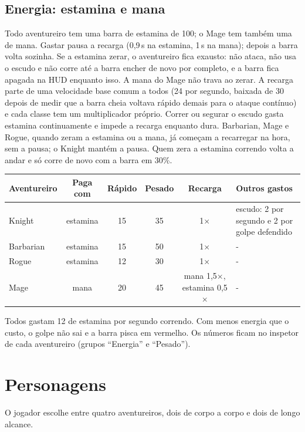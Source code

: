 \documentclass[11pt,a4paper]{article}
\begin{document}
\subsection{Energia: estamina e mana}
\label{sec:energia}

Todo aventureiro tem uma barra de estamina de 100; o Mage tem também uma de mana. Gastar pausa a recarga (0,9\,s na estamina, 1\,s na mana); depois a barra volta sozinha. Se a estamina zerar, o aventureiro fica exausto: não ataca, não usa o escudo e não corre até a barra encher de novo por completo, e a barra fica apagada na HUD enquanto isso. A mana do Mage não trava ao zerar. A recarga parte de uma velocidade base comum a todos (24 por segundo, baixada de 30 depois de medir que a barra cheia voltava rápido demais para o ataque contínuo) e cada classe tem um multiplicador próprio. Correr ou segurar o escudo gasta estamina continuamente e impede a recarga enquanto dura. Barbarian, Mage e Rogue, quando zeram a estamina ou a mana, já começam a recarregar na hora, sem a pausa; o Knight mantém a pausa. Quem zera a estamina correndo volta a andar e só corre de novo com a barra em 30\%.

\begin{xltabular}{\textwidth}{@{}lccccX@{}}
\toprule
\textbf{Aventureiro} & \textbf{Paga com} & \textbf{Rápido} & \textbf{Pesado} & \textbf{Recarga} & \textbf{Outros gastos} \\
\midrule
Knight    & estamina & 15 & 35 & 1$\times$ & escudo: 2 por segundo e 2 por golpe defendido \\
Barbarian & estamina & 15 & 50 & 1$\times$ & - \\
Rogue     & estamina & 12 & 30 & 1$\times$ & - \\
Mage      & mana     & 20 & 45 & mana 1,5$\times$, estamina 0,5$\times$ & - \\
\bottomrule
\end{xltabular}

Todos gastam 12 de estamina por segundo correndo. Com menos energia que o custo, o golpe não sai e a barra pisca em vermelho. Os números ficam no inspetor de cada aventureiro (grupos ``Energia'' e ``Pesado'').

\section{Personagens}

O jogador escolhe entre quatro aventureiros, dois de corpo a corpo e dois de longo alcance.
\end{document}
